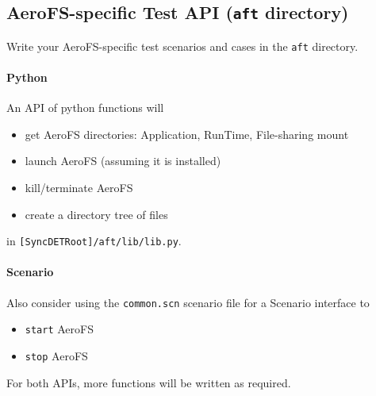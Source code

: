 \subsection{AeroFS-specific Test API ({\tt aft} directory)}
Write your AeroFS-specific test scenarios and cases in the {\tt aft} directory.

\paragraph{Python} An API of python functions will
\begin{itemize}
\item get AeroFS directories: Application, RunTime, File-sharing mount
\item launch AeroFS (assuming it is installed)
\item kill/terminate AeroFS
\item create a directory tree of files
\end{itemize}
in {\tt [SyncDETRoot]/aft/lib/lib.py}.

\paragraph{Scenario}
Also consider using the {\tt common.scn} scenario file for a Scenario interface
to 
\begin{itemize}
\item {\tt start} AeroFS
\item {\tt stop} AeroFS
\end{itemize}

For both APIs, more functions will be written as required.
